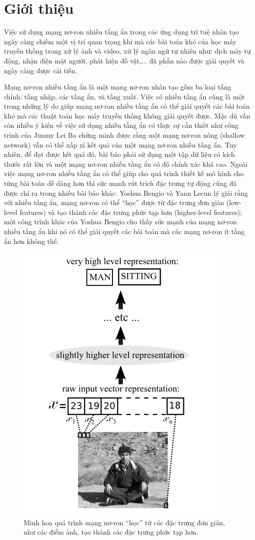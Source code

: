 \chapter{Giới thiệu}
\label{Chapter1}

Việc sử dụng mạng nơ-ron nhiều tầng ẩn trong các ứng dụng trí tuệ nhân tạo ngày càng chiếm một vị trí quan trọng khi mà các bài toán khó của học máy truyền thống trong xử lý ảnh và video, xử lý ngôn ngữ tự nhiên như: dịch máy tự động, nhận diện mặt người, phát hiện đồ vật,... đã phần nào được giải quyết và ngày càng được cải tiến.

Mạng nơ-ron nhiều tầng ẩn là một mạng nơ-ron nhân tạo gồm ba loại tầng chính: tầng nhập, các tầng ẩn, và tầng xuất. Việc có nhiều tầng ẩn cũng là một trong những lý do giúp mạng nơ-ron nhiều tầng ẩn có thể giải quyết các bài toán khó mà các thuật toán học máy truyền thống không giải quyết được. Mặc dù vẫn còn nhiều ý kiến về việc sử dụng nhiều tầng ẩn có thực sự cần thiết như công trình của Jimmy Lei Ba\cite{ba2013dodeepnets} chứng minh được rằng một mạng nơ-ron nông (shallow network) vẫn có thể xấp xỉ kết quả của một mạng nơ-ron nhiều tầng ẩn. Tuy nhiên, để đạt được kết quả đó, bài báo phải sử dụng một tập dữ liệu có kích thước rất lớn và một mạng nơ-ron nhiều tầng ẩn có độ chính xác khá cao. Ngoài việc mạng nơ-ron nhiều tầng ẩn có thể giúp cho quá trình thiết kế mô hình cho từng bài toán dễ dàng hơn\cite{nielsen2015neural} thì sức mạnh rút trích đặc trưng tự động cũng đã được chỉ ra trong nhiều bài báo khác: Yoshua Bengio và Yann Lecun lý giải rằng với nhiều tầng ẩn, mạng nơ-ron có thể ``học'' được từ đặc trưng đơn giản (low-level features) và tạo thành các đặc trưng phức tạp hơn (higher-level features)\cite{bengio2007scaling}; một công trình khác của Yoshua Bengio cho thấy sức mạnh của mạng nơ-ron nhiều tầng ẩn khi nó có thể giải quyết các bài toán mà các mạng nơ-ron ít tầng ẩn hơn không thể\cite{bengio2009learning}.

\begin{figure}[htp]
\centering
\includegraphics[width=65 mm]{images/layers-features.png}
\caption{Minh hoạ quá trình mạng nơ-ron ``học'' từ các đặc trưng đơn giản, như các điểm ảnh, tạo thành các đặc trưng phức tạp hơn.\cite{bengio2009learning}}
\label{fig:layers-features}
\end{figure}

